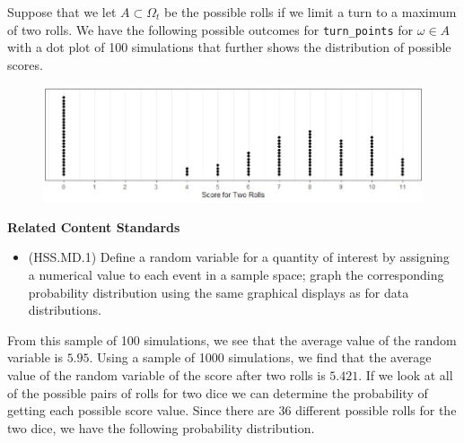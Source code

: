\documentclass[
]{book}
\providecommand{\tightlist}{%
  \setlength{\itemsep}{0pt}\setlength{\parskip}{0pt}}
\newenvironment{standards}{}{}
\theoremstyle{definition}
\theoremstyle{definition}
\theoremstyle{definition}
\theoremstyle{definition}
\theoremstyle{remark}
\begin{document}
Suppose that we let \(A\subset \Omega_t\) be the possible rolls if we limit a turn to a maximum of two rolls. We have the following possible outcomes for \verb|turn_points| for \(\omega \in A\) with a dot plot of 100 simulations that further shows the distribution of possible scores.

\begin{figure}

{\centering \includegraphics[width=0.8\linewidth]{images/two_rolls} 

}

\end{figure}

\begin{standards}

\begin{center}
\textbf{Related Content Standards}

\end{center}

\begin{itemize}
\tightlist
\item
  (HSS.MD.1) Define a random variable for a quantity of interest by assigning a numerical value to each event in a sample space; graph the corresponding probability distribution using the same graphical displays as for data distributions.
\end{itemize}

\end{standards}

From this sample of 100 simulations, we see that the average value of the random variable is \(5.95\). Using a sample of 1000 simulations, we find that the average value of the random variable of the score after two rolls is \(5.421\). If we look at all of the possible pairs of rolls for two dice we can determine the probability of getting each possible score value. Since there are 36 different possible rolls for the two dice, we have the following probability distribution.
\end{document}
